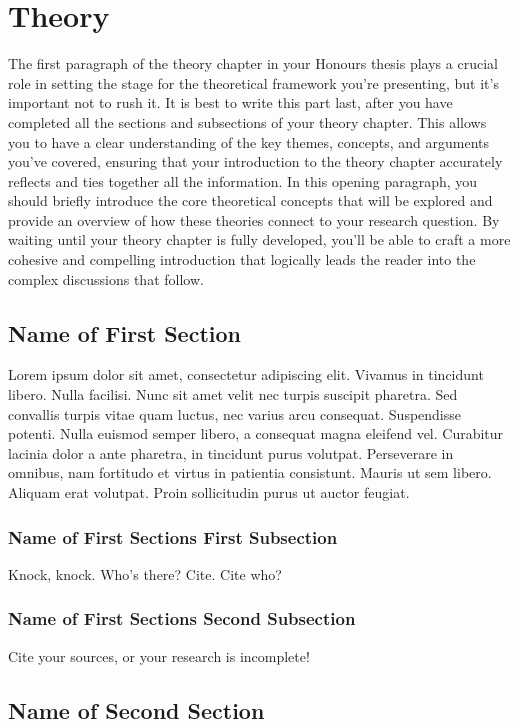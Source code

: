 \chapter{Theory}

The first paragraph of the theory chapter in your Honours thesis plays a crucial role in setting the stage for the theoretical framework you're presenting, but it’s important not to rush it. It is best to write this part last, after you have completed all the sections and subsections of your theory chapter. This allows you to have a clear understanding of the key themes, concepts, and arguments you’ve covered, ensuring that your introduction to the theory chapter accurately reflects and ties together all the information. In this opening paragraph, you should briefly introduce the core theoretical concepts that will be explored and provide an overview of how these theories connect to your research question. By waiting until your theory chapter is fully developed, you’ll be able to craft a more cohesive and compelling introduction that logically leads the reader into the complex discussions that follow.

\section{Name of First Section}
Lorem ipsum dolor sit amet, consectetur adipiscing elit. Vivamus in tincidunt libero. Nulla facilisi. Nunc sit amet velit nec turpis suscipit pharetra. Sed convallis turpis vitae quam luctus, nec varius arcu consequat. Suspendisse potenti. Nulla euismod semper libero, a consequat magna eleifend vel. Curabitur lacinia dolor a ante pharetra, in tincidunt purus volutpat. Perseverare in omnibus, nam fortitudo et virtus in patientia consistunt. Mauris ut sem libero. Aliquam erat volutpat. Proin sollicitudin purus ut auctor feugiat.

\subsection{Name of First Sections First Subsection}
Knock, knock.
Who's there?
Cite.
Cite who?
\subsection{Name of First Sections Second Subsection}
Cite your sources, or your research is incomplete!
\section{Name of Second Section}

